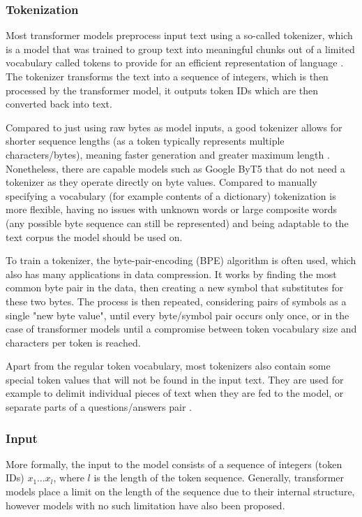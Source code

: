 \subsubsection{Tokenization}

Most transformer models preprocess input text using a so-called tokenizer, which is a model that was trained to group text into meaningful chunks out of a limited vocabulary called tokens to provide for an efficient representation of language \cite{subwordunits}. The tokenizer transforms the text into a sequence of integers, which is then processed by the transformer model, it outputs token IDs which are then converted back into text.

Compared to just using raw bytes as model inputs, a good tokenizer allows for shorter sequence lengths (as a token typically represents multiple characters/bytes), meaning faster generation and greater maximum length \cite{tokenizerchoice}. Nonetheless, there are capable models such as Google ByT5 \cite{xue2022byt5} that do not need a tokenizer as they operate directly on byte values.
Compared to manually specifying a vocabulary (for example contents of a dictionary) tokenization is more flexible, having no issues with unknown words or large composite words (any possible byte sequence can still be represented) and being adaptable to the text corpus the model should be used on.

To train a tokenizer, the byte-pair-encoding (BPE) algorithm \cite{subwordunits} is often used, which also has many applications in data compression. It works by finding the most common byte pair in the data, then creating a new symbol that substitutes for these two bytes. The process is then repeated, considering pairs of symbols as a single "new byte value", until every byte/symbol pair occurs only once, or in the case of transformer models until a compromise between token vocabulary size and characters per token is reached.

Apart from the regular token vocabulary, most tokenizers also contain some special token values that will not be found in the input text. They are used for example to delimit individual pieces of text when they are fed to the model, or separate parts of a questions/answers pair \cite{HuggingFaceTokenizers}.


\subsubsection{Input}

More formally, the input to the model consists of a sequence of integers (token IDs) $x_1 \ldots x_l$, where $l$ is the length of the token sequence.
Generally, transformer models place a limit on the length of the sequence due to their internal structure, however models with no such limitation have also been proposed. \cite{su2023roformer}

